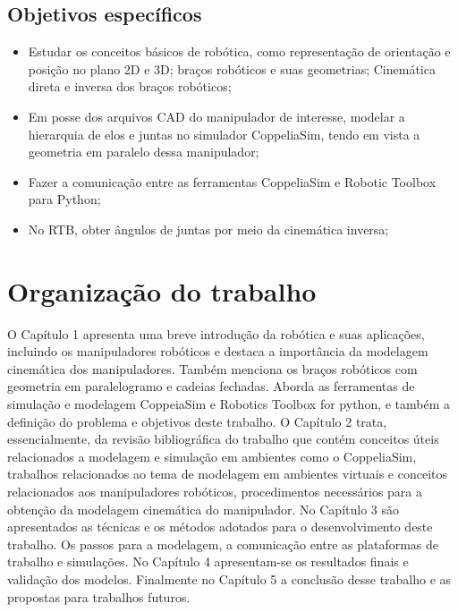 \subsection{Objetivos específicos}

\begin{itemize}
	\item Estudar os conceitos básicos de robótica, como representação de orientação e posição no plano 2D e 3D; braços robóticos e suas geometrias; Cinemática direta e inversa dos braços robóticos;
    \item Em posse dos arquivos CAD do manipulador de interesse, modelar a hierarquia de elos e juntas no simulador CoppeliaSim, tendo em vista a geometria em paralelo dessa manipulador;
    \item Fazer a comunicação entre as ferramentas CoppeliaSim e Robotic Toolbox para Python;
	\item No RTB, obter ângulos de juntas por meio da cinemática inversa;
\end{itemize}

\section{Organização do trabalho}
 
O Capítulo 1 apresenta uma breve introdução da robótica e suas aplicações, incluindo os manipuladores robóticos e destaca a importância da modelagem cinemática dos manipuladores. Também menciona os braços robóticos com geometria em paralelogramo e cadeias fechadas. Aborda as ferramentas de simulação e modelagem CoppeiaSim e Robotics Toolbox for python, e também a definição do problema e objetivos deste trabalho.
O Capítulo 2 trata, essencialmente, da revisão bibliográfica do trabalho que contém conceitos úteis relacionados a modelagem e simulação em ambientes como o CoppeliaSim, trabalhos relacionados ao tema de modelagem em ambientes virtuais e conceitos relacionados aos manipuladores robóticos, procedimentos necessários para a obtenção da modelagem cinemática do manipulador. No Capítulo 3 são apresentados as técnicas e os métodos adotados para o desenvolvimento deste trabalho.  Os passos para a modelagem, a comunicação entre as plataformas de trabalho e simulações. No Capítulo 4 apresentam-se os resultados finais e validação dos modelos. Finalmente no Capítulo 5 a conclusão desse trabalho e as propostas para trabalhos futuros.


